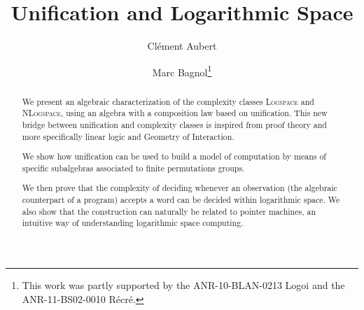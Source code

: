 

\title{Unification and Logarithmic Space}
\author{Clément Aubert \and Marc Bagnol\thanks{This work was partly supported by the ANR-10-BLAN-0213 Logoi and the ANR-11-BS02-0010 Récré.}}

\maketitle








\begin{abstract}
We present an algebraic characterization of the complexity classes \textsc{Logspace} and \textsc{NLogspace}, using an algebra with a composition law based on unification. This new bridge between unification and complexity classes is inspired from proof theory and more specifically linear logic and Geometry of Interaction.

We show how unification can be used to build a model of computation by means of specific subalgebras associated to finite permutations groups.

We then prove that the complexity of deciding whenever an observation (the algebraic counterpart
of a program) accepts a word can be decided within logarithmic space.
We also show that the construction can naturally be related to pointer machines, an intuitive way of understanding logarithmic space computing.



\end{abstract}

